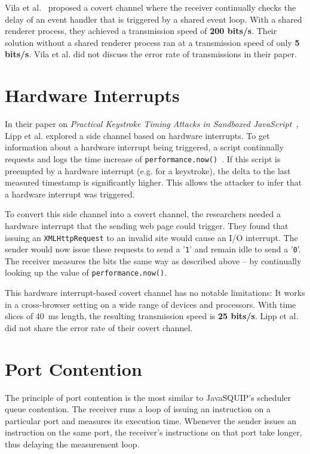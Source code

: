 \documentclass[11pt,
  titlepage=false,
  parskip=half,      %
]{scrreprt}
\begin{document}
Vila et al.~\cite{vila2017loophole} proposed a covert channel where the receiver continually checks the delay of an event handler
that is triggered by a shared event loop.
With a shared renderer process, they achieved a transmission speed of \textbf{200 bits/s}.
Their solution without a shared renderer process ran at a transmission speed of only \textbf{5 bits/s}.
Vila et al. did not discuss the error rate of transmissions in their paper.

\section{Hardware Interrupts}
In their paper on \textit{Practical Keystroke Timing Attacks in Sandboxed JavaScript}~\cite{lipp2017practical},
Lipp et al. explored a side channel based on hardware interrupts.
To get information about a hardware interrupt being triggered,
a script continually requests and logs the time increase of \texttt{performance.now()}~\cite{performancenow}.
If this script is preempted by a hardware interrupt (e.g. for a keystroke),
the delta to the last measured timestamp is significantly higher.
This allows the attacker to infer that a hardware interrupt was triggered.

To convert this side channel into a covert channel,
the researchers needed a hardware interrupt that the sending web page could trigger.
They found that issuing an \texttt{XMLHttpRequest} to an invalid site would cause an I/O interrupt.
The sender would now issue these requests to send a '\texttt{1}' and remain idle to send a '\texttt{0}'.
The receiver measures the bits the same way as described above --
by continually looking up the value of \texttt{performance.now()}.

This hardware interrupt-based covert channel has no notable limitations:
It works in a cross-browser setting on a wide range of devices and processors.
With time slices of 40~ms length, the resulting transmission speed is \textbf{25 bits/s}.
Lipp et al.~\cite{lipp2017practical} did not share the error rate of their covert channel.

\section{Port Contention}
The principle of port contention is the most similar to JavaSQUIP's scheduler queue contention.
The receiver runs a loop of issuing an instruction on a particular port and measures its execution time.
Whenever the sender issues an instruction on the same port, the receiver's instructions on that port take longer,
thus delaying the measurement loop.
\end{document}
